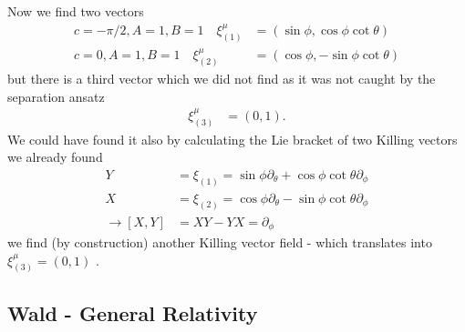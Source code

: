 \documentclass[10pt,a4paper]{article}
\theoremstyle{definition}
\begin{document}
Now we find two vectors
\begin{align}
c=-\pi/2, A=1, B=1\quad \xi^\mu_{(1)}&=(\sin\phi,\cos\phi\cot\theta)\\
c=0, A=1, B=1\quad \xi^\mu_{(2)}&=(\cos\phi,-\sin\phi\cot\theta)
\end{align}
but there is a third vector which we did not find as it was not caught by the separation ansatz
\begin{align}
\xi^\mu_{(3)}&=(0,1).
\end{align}
We could have found it also by calculating the Lie bracket of two Killing vectors we already found
\begin{align}
Y&=\xi_{(1)}=\sin\phi\partial_\theta+\cos\phi\cot\theta\partial_\phi\\
X&=\xi_{(2)}=\cos\phi\partial_\theta-\sin\phi\cot\theta\partial_\phi\\
\rightarrow[X,Y]&=XY-YX=\partial_\phi
\end{align}
we find (by construction) another Killing vector field - which translates into $\xi^\mu_{(3)}=(0,1)$ .

\subsection{{\sc Wald} - General Relativity}
\end{document}
